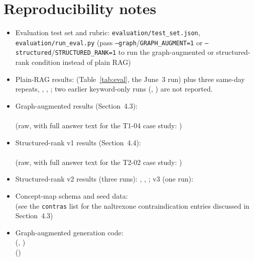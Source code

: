 \documentclass[11pt]{article}
\begin{document}
\section{Reproducibility notes}
\begin{itemize}[leftmargin=*]
  \item Evaluation test set and rubric: \texttt{evaluation/test\_set.json}, \texttt{evaluation/run\_eval.py} (pass \texttt{--graph}/\texttt{GRAPH\_AUGMENT=1} or \texttt{--structured}/\texttt{STRUCTURED\_RANK=1} to run the graph-augmented or structured-rank condition instead of plain RAG)
  \item Plain-RAG results:  (Table~\ref{tab:eval}, the June~3 run) plus three same-day repeats, , , ; two earlier keyword-only runs (, ) are not reported.
  \item Graph-augmented results (Section~4.3):\\
    \\
    (raw, with full answer text for the T1-04 case study: )
  \item Structured-rank v1 results (Section~4.4):\\
    \\
    (raw, with full answer text for the T2-02 case study: )
  \item Structured-rank v2 results (three runs): , , ; v3 (one run): 
  \item Concept-map schema and seed data: \\
    (see the \texttt{contras} list for the naltrexone contraindication entries discussed in Section~4.3)
  \item Graph-augmented generation code:\\
     (, )\\
     ()\\

\end{itemize}
\end{document}
